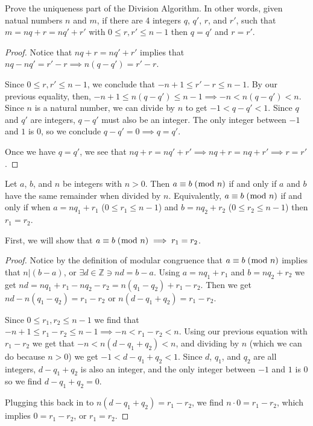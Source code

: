 \documentclass[../main.tex]{subfiles}
\begin{document}
\begin{thm} \label{1.27}
Prove the uniqueness part of the Division Algorithm. In other words, given natual numbers $n$ and $m$, if there are 4 integers $q$, $q'$, $r$, and $r'$, such that $m = nq + r = nq' + r'$ with $0 \leq r, r' \leq n-1$ then $q = q'$ and $r = r'$.
\end{thm}

\begin{proof}
  Notice that $nq + r = nq' + r'$ implies that $nq - nq' = r' - r \implies n(q-q') = r' - r$.

  Since $0 \leq r, r' \leq n-1$, we conclude that $-n+1 \leq r' - r \leq n-1$. By our previous equality, then, $-n+1 \leq n(q-q') \leq n-1 \implies -n < n(q-q') < n$. Since $n$ is a natural number, we can divide by $n$ to get $-1 < q-q' < 1$. Since $q$ and $q'$ are integers, $q-q'$ must also be an integer. The only integer between $-1$ and $1$ is $0$, so we conclude $q-q' = 0 \implies q = q'$.

  Once we have $q=q'$, we see that $nq + r = nq' + r' \implies nq + r = nq + r' \implies r = r'$.
\end{proof}



\pagebreak



\begin{thm} \label{1.28}
  Let $a$, $b$, and $n$ be integers with $n > 0$. Then $a \equiv b \; (\bmod \; n)$ if and only if $a$ and $b$ have the same remainder when divided by $n$. Equivalently, $a \equiv b \; (\bmod \; n)$ if and only if when $a = nq_1 + r_1$ ($0 \leq r_1 \leq n-1$) and $b = nq_2 + r_2$ ($0 \leq r_2 \leq n-1$) then $r_1 = r_2$.
\end{thm}

First, we will show that $a \equiv b \; (\bmod \; n) \implies r_1 = r_2$.
\begin{proof}
  Notice by the definition of modular congruence that $a \equiv b \; (\bmod \; n)$ implies that $n | (b-a)$, or $\exists d \in \mathbb{Z} \ni nd = b-a$. Using $a = nq_1 + r_1$ and $b = nq_2 + r_2$ we get $nd = nq_1 + r_1 - nq_2 - r_2 = n(q_1 - q_2) + r_1 - r_2$. Then we get $nd - n(q_1 - q_2) = r_1 - r_2$ or $n(d - q_1 + q_2) = r_1 - r_2$.

  Since $0 \leq r_1,r_2 \leq n-1$ we find that $-n+1 \leq r_1 - r_2 \leq n-1 \implies -n < r_1 - r_2 < n$. Using our previous equation with $r_1 - r_2$ we get that $-n < n(d - q_1 + q_2) < n$, and dividing by $n$ (which we can do because $n > 0$) we get $-1 < d - q_1 + q_2 < 1$.
  Since $d$, $q_1$, and $q_2$ are all integers, $d - q_1 + q_2$ is also an integer, and the only integer between $-1$ and $1$ is $0$ so we find $d - q_1 + q_2 = 0$.

  Plugging this back in to $n(d - q_1 + q_2) = r_1 - r_2$, we find $n \cdot 0 = r_1 - r_2$, which implies $0 = r_1 - r_2$, or $r_1 = r_2$.
\end{proof}
\end{document}
